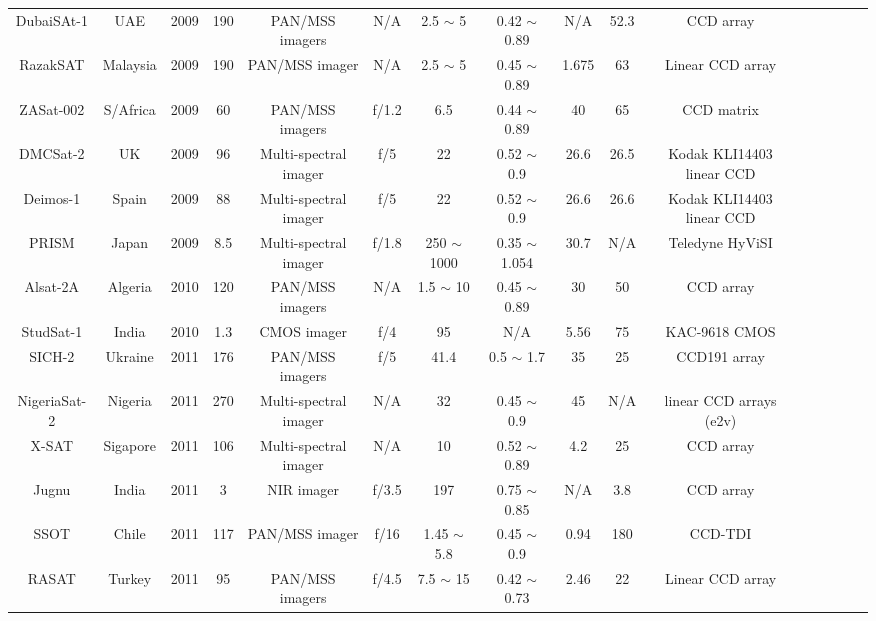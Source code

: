 \documentclass[final,5p,times,twocolumn,authoryear]{elsarticle}
\begin{document}
\begin{table}
{\begin{tabular}{c c c c c c c c c c c c c c c c}
		    DubaiSAt-1 & UAE & 2009 & 190 & PAN/MSS imagers & N/A & 2.5 $\sim$ 5 & 0.42 $\sim$ 0.89 &  N/A &  52.3 & CCD array & \citep{al2009dubaisat}\\		
		    RazakSAT & Malaysia & 2009 & 190 & PAN/MSS imager & N/A & 2.5 $\sim$ 5 & 0.45 $\sim$ 0.89 & 1.675 & 63 & Linear CCD array & \citep{eoportal}\\	
		    ZASat-002 & S/Africa & 2009 & 60 & PAN/MSS imagers & f/1.2 & 6.5 & 0.44 $\sim$ 0.89 &  40 & 65 &  CCD matrix & \citep{burger2006south} \\
		    DMCSat-2 & UK & 2009 &  96 & Multi-spectral imager & f/5& 22 & 0.52 $\sim$ 0.9 & 26.6 & 26.5 & Kodak KLI14403 linear CCD  & \citep{eoportal}\\	
		    Deimos-1 & Spain & 2009 & 88 & Multi-spectral imager & f/5 & 22 & 0.52 $\sim$ 0.9 & 26.6 & 26.6 & Kodak KLI14403 linear CCD & \citep{eoportal}\\ 	    
		    PRISM & Japan & 2009 & 8.5 & Multi-spectral imager & f/1.8 & 250 $\sim$ 1000 & 0.35 $\sim$ 1.054 &  30.7 & N/A &   Teledyne HyViSI & \citep{mouroulis2014portable}\\		
		    Alsat-2A & Algeria & 2010 & 120 & PAN/MSS imagers & N/A & 1.5 $\sim$ 10 & 0.45 $\sim$ 0.89 &  30 & 50 &  CCD array & \cite{kameche2016flight}  \\	
		    StudSat-1 & India & 2010 & 1.3 & CMOS imager & f/4 & 95 & N/A &  5.56 & 75 & KAC-9618 CMOS & \citep{eoportal}\\		    	
		    SICH-2 & Ukraine & 2011 & 176 & PAN/MSS imagers & f/5 & 41.4 & 0.5 $\sim$ 1.7 & 35 & 25 &  CCD191 array & \citep{eoportal}\\
		    NigeriaSat-2 & Nigeria & 2011 & 270 & Multi-spectral imager & N/A & 32 & 0.45 $\sim$ 0.9 &  45 & N/A & linear CCD arrays (e2v) & \citep{eoportal}\\		
		    X-SAT & Sigapore & 2011 & 106 & Multi-spectral imager & N/A & 10 & 0.52 $\sim$ 0.89 &  4.2 & 25 &  CCD array & \citep{eoportal}\\		         
		    Jugnu  & India & 2011& 3 & NIR imager & f/3.5 & 197 & 0.75 $\sim$ 0.85 &  N/A & 3.8 &  CCD array & \citep{eoportal}\\		      
		    SSOT & Chile & 2011 & 117 & PAN/MSS imager & f/16 & 1.45 $\sim$ 5.8 & 0.45 $\sim$ 0.9 &  0.94 & 180 &CCD-TDI & \citep{eoportal}\\	
		    RASAT & Turkey & 2011 & 95 & PAN/MSS imagers & f/4.5 & 7.5 $\sim$ 15 & 0.42 $\sim$ 0.73 &  2.46 & 22 &  Linear CCD array &  \citep{teke2016satellite}\\	

\end{tabular}}
\end{table}
\end{document}
